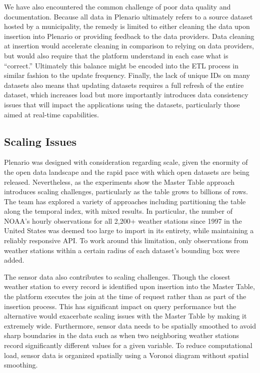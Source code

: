 \documentclass[11pt]{article}
\begin{document}
We have also encountered the common challenge of poor data quality and documentation. Because all data in Plenario ultimately refers to a source dataset hosted by a municipality, the remedy is limited to either cleaning the data upon insertion into Plenario or providing feedback to the data providers. Data cleaning at insertion would accelerate cleaning in comparison to relying on data providers, but would also require that the platform understand in each case what is ``correct.'' Ultimately this balance might be encoded into the ETL process in similar fashion to the update frequency. Finally, the lack of unique IDs on many datasets also means that updating datasets requires a full refresh of the entire dataset, which increases load but more importantly introduces data consistency issues that will impact the applications using the datasets, particularly those aimed at real-time capabilities. 

\subsection{\textbf{Scaling Issues}}
Plenario was designed with consideration regarding scale, given the enormity of the open data landscape and the rapid pace with which open datasets are being released. Nevertheless, as the experiments show the Master Table approach introduces scaling challenges, particularly as the table grows to billions of rows. The team has explored a variety of approaches including partitioning the table along the temporal index, with mixed results. In particular, the number of NOAA's hourly observations for all 2,200+ weather stations since 1997 in the United States was deemed too large to import in its entirety, while maintaining a reliably responsive API. To work around this limitation, only observations from weather stations within a certain radius of each dataset's bounding box were added.

The sensor data also contributes to scaling challenges. Though the closest weather station to every record is identified upon insertion into the Master Table, the platform executes the join at the time of request rather than as part of the insertion process. This has significant impact on query performance but the alternative would exacerbate scaling issues with the Master Table by making it extremely wide. Furthermore, sensor data needs to be spatially smoothed to avoid sharp boundaries in the data such as when two neighboring weather stations record significantly different values for a given variable. To reduce computational load, sensor data is organized spatially using a Voronoi diagram \cite{voronoi_1908} without spatial smoothing.
\end{document}
